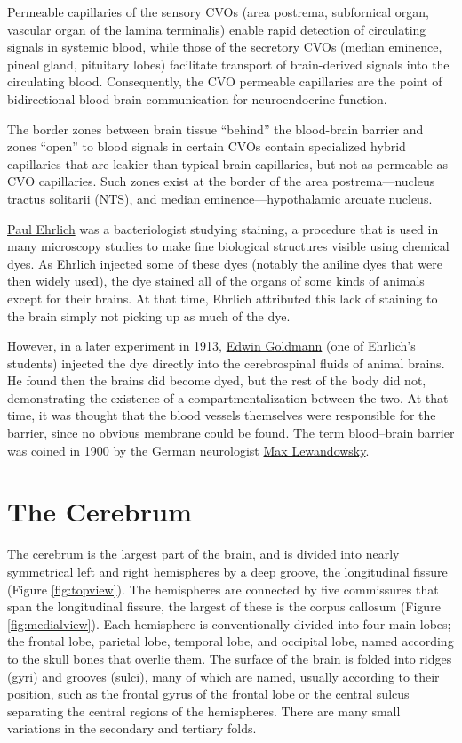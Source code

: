 Permeable capillaries of the sensory CVOs (area postrema, subfornical organ, vascular organ of the lamina terminalis) enable rapid detection of circulating signals in systemic blood, while those of the secretory CVOs (median eminence, pineal gland, pituitary lobes) facilitate transport of brain-derived signals into the circulating blood. Consequently, the CVO permeable capillaries are the point of bidirectional blood-brain communication for neuroendocrine function.

The border zones between brain tissue ``behind'' the blood-brain barrier and zones ``open'' to blood signals in certain CVOs contain specialized hybrid capillaries that are leakier than typical brain capillaries, but not as permeable as CVO capillaries. Such zones exist at the border of the area postrema---nucleus tractus solitarii (NTS), and median eminence---hypothalamic arcuate nucleus.

\href{https://en.wikipedia.org/wiki/Paul_Ehrlich}{Paul Ehrlich} was a bacteriologist studying staining, a procedure that is used in many microscopy studies to make fine biological structures visible using chemical dyes. As Ehrlich injected some of these dyes (notably the aniline dyes that were then widely used), the dye stained all of the organs of some kinds of animals except for their brains. At that time, Ehrlich attributed this lack of staining to the brain simply not picking up as much of the dye.

However, in a later experiment in 1913, \href{https://en.wikipedia.org/wiki/Edwin_Goldmann}{Edwin Goldmann} (one of Ehrlich's students) injected the dye directly into the cerebrospinal fluids of animal brains. He found then the brains did become dyed, but the rest of the body did not, demonstrating the existence of a compartmentalization between the two. At that time, it was thought that the blood vessels themselves were responsible for the barrier, since no obvious membrane could be found. The term blood--brain barrier was coined in 1900 by the German neurologist \href{https://en.wikipedia.org/wiki/Max_Lewandowsky}{Max Lewandowsky}.

\hypertarget{the-cerebrum}{%
\section{The Cerebrum}\label{the-cerebrum}}

The cerebrum is the largest part of the brain, and is divided into nearly symmetrical left and right hemispheres by a deep groove, the longitudinal fissure (Figure \ref{fig:topview}). The hemispheres are connected by five commissures that span the longitudinal fissure, the largest of these is the corpus callosum (Figure \ref{fig:medialview}). Each hemisphere is conventionally divided into four main lobes; the frontal lobe, parietal lobe, temporal lobe, and occipital lobe, named according to the skull bones that overlie them. The surface of the brain is folded into ridges (gyri) and grooves (sulci), many of which are named, usually according to their position, such as the frontal gyrus of the frontal lobe or the central sulcus separating the central regions of the hemispheres. There are many small variations in the secondary and tertiary folds.



